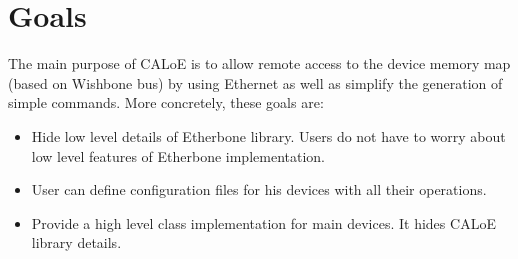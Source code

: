 \section{Goals}

The main purpose of CALoE is to allow remote access to the device memory map (based on Wishbone bus) by using Ethernet as well as simplify the generation of simple commands. More concretely, these goals are: 

\begin{itemize}
\item{Hide low level details of Etherbone library. Users do not have to worry about low level features of Etherbone implementation.}
\item{User can define configuration files for his devices with all their operations.}
\item{Provide a high level class implementation for main devices. It hides CALoE library details.}
\end{itemize}

